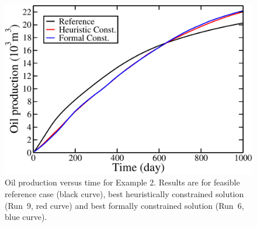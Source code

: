 \begin{figure} [ht]
\begin{center}
\includegraphics[totalheight=2.17in,angle=0]{figures/spe10TopLayerRevenue.pdf}
\end{center}
\caption{Oil production versus time for Example 2. Results are for
  feasible reference case (black curve), best heuristically constrained solution (Run~9, red curve)
  and best formally constrained solution (Run~6, blue curve).}
\label{fig:SPE10TopLayerRevenue}
\end{figure}
